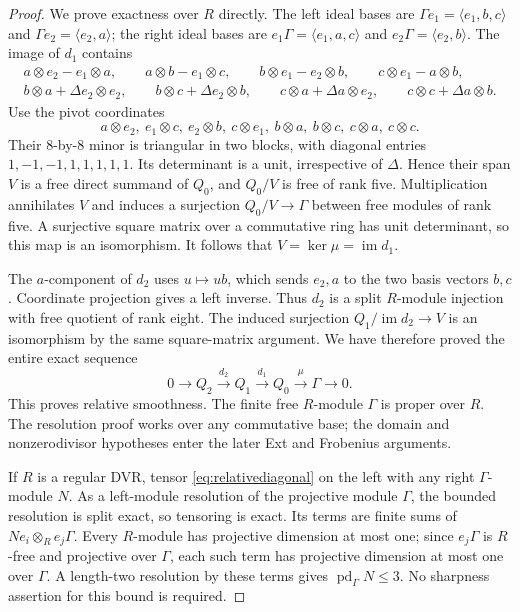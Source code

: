 \begin{proof}
We prove exactness over $R$ directly. The left ideal bases are
$\Gamma e_1=\langle e_1,b,c\rangle$ and
$\Gamma e_2=\langle e_2,a\rangle$; the right ideal bases are
$e_1\Gamma=\langle e_1,a,c\rangle$ and
$e_2\Gamma=\langle e_2,b\rangle$.
The image of $d_1$ contains
\[
 \begin{gathered}
 a\otimes e_2-e_1\otimes a,\qquad
 a\otimes b-e_1\otimes c,\qquad
 b\otimes e_1-e_2\otimes b,\qquad
 c\otimes e_1-a\otimes b,\\
 b\otimes a+\Delta e_2\otimes e_2,\qquad
 b\otimes c+\Delta e_2\otimes b,\qquad
 c\otimes a+\Delta a\otimes e_2,\qquad
 c\otimes c+\Delta a\otimes b.
 \end{gathered}
\]
Use the pivot coordinates
\[
 a\otimes e_2,\ e_1\otimes c,\ e_2\otimes b,\ c\otimes e_1,\
 b\otimes a,\ b\otimes c,\ c\otimes a,\ c\otimes c.
\]
Their $8$-by-$8$ minor is triangular in two blocks, with
diagonal entries $1,-1,-1,1,1,1,1,1$. Its determinant is
a unit, irrespective of $\Delta$. Hence their span $V$
is a free direct summand of $Q_0$, and $Q_0/V$ is free of
rank five. Multiplication annihilates $V$ and induces a
surjection $Q_0/V\to\Gamma$ between free modules of rank
five. A surjective square matrix over a commutative ring
has unit determinant, so this map is an isomorphism.
It follows that $V=\ker\mu=\operatorname{im}d_1$.

The $a$-component of $d_2$ uses $u\mapsto ub$, which sends
$e_2,a$ to the two basis vectors $b,c$. Coordinate projection
gives a left inverse. Thus $d_2$ is a split $R$-module
injection with free quotient of rank eight. The induced
surjection $Q_1/\operatorname{im}d_2\to V$ is an
isomorphism by the same square-matrix argument. We have
therefore proved the entire exact sequence
\begin{equation}\label{eq:relativediagonal}
 0\longrightarrow Q_2\xrightarrow{d_2}Q_1
   \xrightarrow{d_1}Q_0\xrightarrow{\mu}\Gamma
   \longrightarrow0.
\end{equation}
This proves relative smoothness. The finite free
$R$-module $\Gamma$ is proper over $R$.
The resolution proof works over any commutative base;
the domain and nonzerodivisor hypotheses enter the later
Ext and Frobenius arguments.

If $R$ is a regular DVR, tensor
\eqref{eq:relativediagonal} on the left with any right
$\Gamma$-module $N$. As a left-module resolution of the
projective module $\Gamma$, the bounded resolution is split
exact, so tensoring is exact. Its terms are finite sums of
$Ne_i\otimes_R e_j\Gamma$. Every $R$-module has projective
dimension at most one; since $e_j\Gamma$ is $R$-free and
projective over $\Gamma$, each such term has projective
dimension at most one over $\Gamma$. A length-two resolution
by these terms gives $\operatorname{pd}_\Gamma N\le3$.
No sharpness assertion for this bound is required.


\end{proof}
